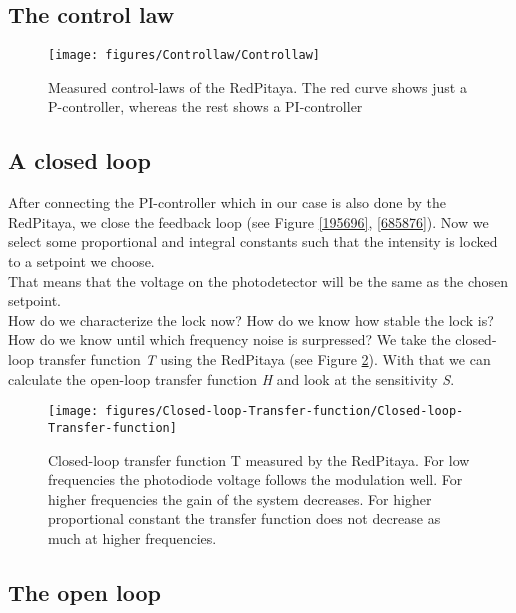 \documentclass[10pt]{article}
\begin{document}
\subsection{The control law}\label{the-control-law}
\begin{figure}[h!]
\begin{center}
\texttt{[image: figures/Controllaw/Controllaw]}
\caption{{Measured control-laws of the RedPitaya. The red curve shows just a
P-controller, whereas the rest shows a PI-controller
{\label{569947}}%
}}
\end{center}
\end{figure}

\subsection{A closed loop}\label{a-closed-loop}

After connecting the PI-controller which in our case is also done by the
RedPitaya, we close the feedback loop (see Figure \ref{195696},
\ref{685876}). Now we select some proportional and integral constants
such that the intensity is locked to a setpoint we choose.\\
That means that the voltage on the photodetector will be the same as the
chosen setpoint.\\
How do we characterize the lock now? How do we know how stable the lock
is? How do we know until which frequency noise is surpressed? We take
the closed-loop transfer function \emph{T} using the RedPitaya (see
Figure \ref{852979}). With that we can calculate the open-loop transfer
function \emph{H} and look at the sensitivity \emph{S}.
\begin{figure}[h!]
\begin{center}
\texttt{[image: figures/Closed-loop-Transfer-function/Closed-loop-Transfer-function]}
\caption{{Closed-loop transfer function T measured by the RedPitaya. For low
frequencies the photodiode voltage follows the modulation well. For
higher frequencies the gain of the system decreases. For higher
proportional constant the transfer function does not decrease as much at
higher frequencies.
{\label{852979}}%
}}
\end{center}
\end{figure}

\subsection{The open loop}\label{the-open-loop}
\end{document}
